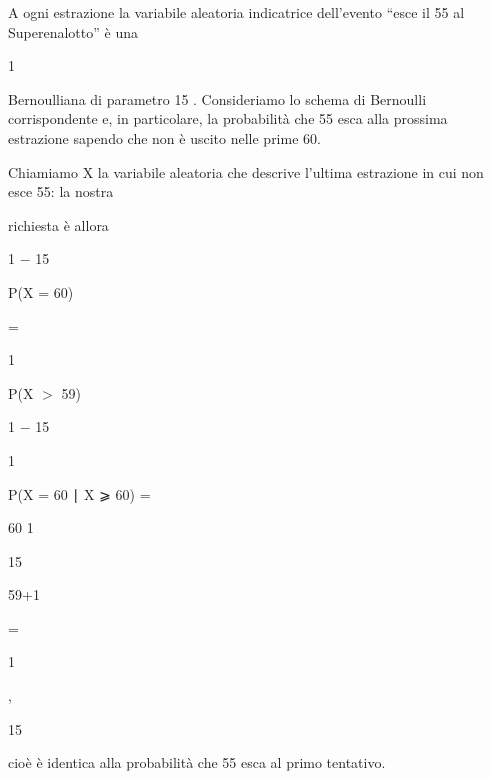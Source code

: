 \documentclass[a4paper,portrait,12pt]{article}
\begin{document}
\begin{flushleft}
A ogni estrazione la variabile aleatoria indicatrice dell'evento {``}esce il 55 al Superenalotto'' \`{e} una
\end{flushleft}


1


\begin{flushleft}
Bernoulliana di parametro 15 . Consideriamo lo schema di Bernoulli corrispondente e, in particolare, la probabilit\`{a} che 55 esca alla prossima estrazione sapendo che non \`{e} uscito nelle prime 60.
\end{flushleft}


\begin{flushleft}
Chiamiamo X la variabile aleatoria che descrive l'ultima estrazione in cui non esce 55: la nostra
\end{flushleft}


\begin{flushleft}
richiesta \`{e} allora
\end{flushleft}


1 $-$ 15


\begin{flushleft}
P(X = 60)
\end{flushleft}


=


1


\begin{flushleft}
P(X $>$ 59)
\end{flushleft}


1 $-$ 15


1





\begin{flushleft}
P(X = 60 ∣ X ⩾ 60) =
\end{flushleft}





60 1


15


59+1





=





1


,


15





\begin{flushleft}
cio\`{e} \`{e} identica alla probabilit\`{a} che 55 esca al primo tentativo.
\end{flushleft}
\end{document}
